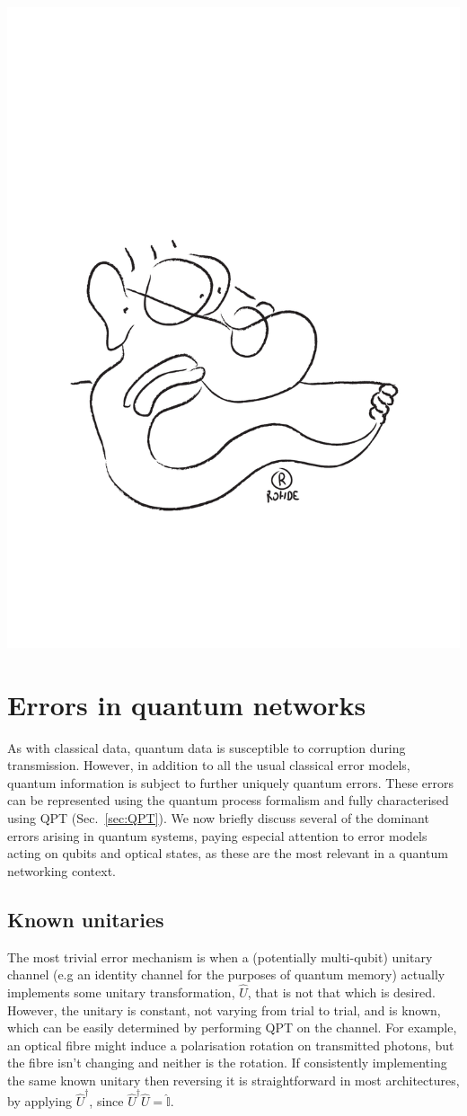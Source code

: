 \documentclass[aps, rmp, twocolumn, amsmath, amssymb, nofootinbib, superscriptaddress, longbibliography, floatfix, table-of-contents, eqsecnum]{revtex4-1}
\begin{document}
\begin{center}
	\includegraphics[width=0.6\columnwidth]{sketch_8}
\end{center}

%
%

\section{Errors in quantum networks} \label{sec:errors_in_nets} 

As with classical data, quantum data is susceptible to corruption during transmission. However, in addition to all the usual classical error models, quantum information is subject to further uniquely quantum errors. These errors can be represented using the quantum process formalism and fully characterised using QPT (Sec.~\ref{sec:QPT}). We now briefly discuss several of the dominant errors arising in quantum systems, paying especial attention to error models acting on qubits and optical states, as these are the most relevant in a quantum networking context.

%
%

\subsection{Known unitaries} 

The most trivial error mechanism is when a (potentially multi-qubit) unitary channel (e.g an identity channel for the purposes of quantum memory) actually implements some unitary transformation, $\hat{U}$, that is not that which is desired. However, the unitary is constant, not varying from trial to trial, and is known, which can be easily determined by performing QPT on the channel. For example, an optical fibre might induce a polarisation rotation on transmitted photons, but the fibre isn't changing and neither is the rotation. If consistently implementing the same known unitary then reversing it is straightforward in most architectures, by applying $\hat{U}^\dag$, since $\hat{U}^\dag\hat{U}=\hat{\mathbb{I}}$.
\end{document}
